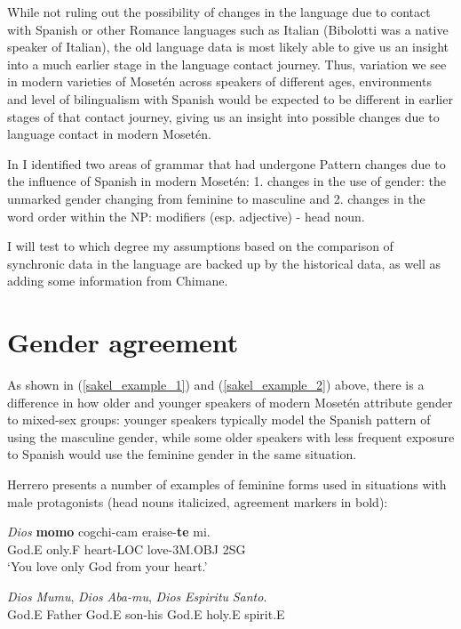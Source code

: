 \documentclass[output=paper,colorlinks,citecolor=brown
]{langscibook}
\begin{document}
While not ruling out the possibility of changes in the language due to contact with Spanish or other Romance languages such as Italian (Bibolotti was a native speaker of Italian), the old language data is most likely able to give us an insight into a much earlier stage in the language contact journey. Thus, variation we see in modern varieties of Mosetén across speakers of different ages, environments and level of bilingualism with Spanish would be expected to be different in earlier stages of that contact journey, giving us an insight into possible changes due to language contact in modern Mosetén.

In \citep{sakel2007moseten} I identified two areas of grammar that had undergone Pattern changes due to the influence of Spanish in modern Mosetén: 1. changes in the use of gender: the unmarked gender changing from feminine to masculine and 2. changes in the word order within the NP: modifiers (esp. adjective) - head noun.

I will test to which degree my assumptions based on the comparison of synchronic data in the language are backed up by the historical data, as well as adding some information from Chimane.

\section{Gender agreement}
As shown in (\ref{sakel_example_1}) and (\ref{sakel_example_2}) above, there is a difference in how older and younger speakers of modern Mosetén attribute gender to mixed-sex groups: younger speakers typically model the Spanish pattern of using the masculine gender, while some older speakers with less frequent exposure to Spanish would use the feminine gender in the same situation. 

Herrero  presents a number of examples of feminine forms used in situations with male protagonists (head nouns italicized, agreement markers in bold):

\ea \label{sakel_example_6}
\gll \emph{Dios} 	\textbf{momo}	cogchi-cam 	eraise-\textbf{te} 	mi.\\
     God.E	only.F	heart-LOC	love-3M.OBJ	2SG\\
\glt ‘You love only God from your heart.’
\z

\ea \label{sakel_example_7}
\gll \emph{Dios} \emph{Mumu}, 	\emph{Dios} \emph{Aba-mu},	\emph{Dios} \emph{Espiritu} \emph{Santo}.\\
     God.E Father	God.E son-his	God.E holy.E spirit.E\\
     
\end{document}
